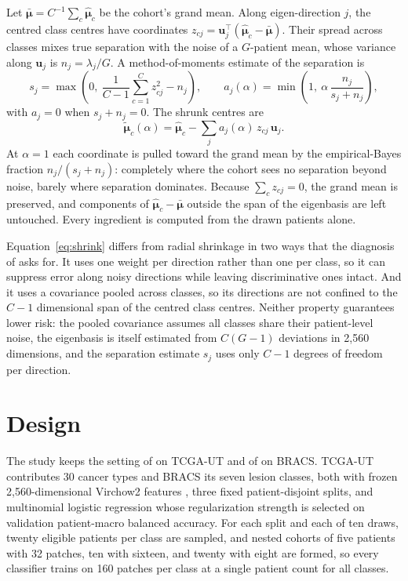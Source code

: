 \documentclass[11pt]{article}
\begin{document}
Let $\bar{\boldsymbol\mu}=C^{-1}\sum_c\hat{\boldsymbol\mu}_c$ be the cohort's grand mean. Along eigen-direction $j$, the centred class centres have coordinates $z_{cj}=\mathbf u_j^\top(\hat{\boldsymbol\mu}_c-\bar{\boldsymbol\mu})$. Their spread across classes mixes true separation with the noise of a $G$-patient mean, whose variance along $\mathbf u_j$ is $n_j=\lambda_j/G$. A method-of-moments estimate of the separation is
\begin{equation}
  s_j=\max\!\left(0,\ \frac{1}{C-1}\sum_{c=1}^{C}z_{cj}^{2}-n_j\right),
  \qquad
  a_j(\alpha)=\min\!\left(1,\ \alpha\,\frac{n_j}{s_j+n_j}\right),
  \label{eq:weight}
\end{equation}
\noindent with $a_j=0$ when $s_j+n_j=0$. The shrunk centres are
\begin{equation}
  \tilde{\boldsymbol\mu}_c(\alpha)=\hat{\boldsymbol\mu}_c-\sum_{j}a_j(\alpha)\,z_{cj}\,\mathbf u_j .
  \label{eq:shrink}
\end{equation}
\noindent At $\alpha=1$ each coordinate is pulled toward the grand mean by the empirical-Bayes fraction $n_j/(s_j+n_j)$: completely where the cohort sees no separation beyond noise, barely where separation dominates. Because $\sum_c z_{cj}=0$, the grand mean is preserved, and components of $\hat{\boldsymbol\mu}_c-\bar{\boldsymbol\mu}$ outside the span of the eigenbasis are left untouched. Every ingredient is computed from the drawn patients alone.

Equation~\ref{eq:shrink} differs from radial shrinkage in two ways that the diagnosis of \citet{queisler2026centreShrinkage} asks for. It uses one weight per direction rather than one per class, so it can suppress error along noisy directions while leaving discriminative ones intact. And it uses a covariance pooled across classes, so its directions are not confined to the $C-1$ dimensional span of the centred class centres. Neither property guarantees lower risk: the pooled covariance assumes all classes share their patient-level noise, the eigenbasis is itself estimated from $C(G-1)$ deviations in 2,560 dimensions, and the separation estimate $s_j$ uses only $C-1$ degrees of freedom per direction.

\section{Design}
\label{sec:design}
The study keeps the setting of \citet{queisler2026centreError} on TCGA-UT and of \citet{queisler2026bracsMechanism} on BRACS. TCGA-UT contributes 30 cancer types and BRACS its seven lesion classes, both with frozen 2,560-dimensional Virchow2 features \citep{zimmermann2024virchow2}, three fixed patient-disjoint splits, and multinomial logistic regression whose regularization strength is selected on validation patient-macro balanced accuracy. For each split and each of ten draws, twenty eligible patients per class are sampled, and nested cohorts of five patients with 32 patches, ten with sixteen, and twenty with eight are formed, so every classifier trains on 160 patches per class at a single patient count for all classes.
\end{document}
